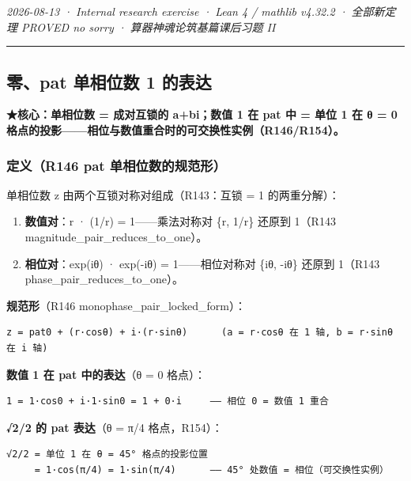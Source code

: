 \documentclass[
]{article}
\providecommand{\tightlist}{%
  \setlength{\itemsep}{0pt}\setlength{\parskip}{0pt}}
\begin{document}
\emph{2026-08-13 · Internal research exercise · Lean 4 / mathlib v4.32.2
· 全部新定理 PROVED no sorry · 算器神魂论筑基篇课后习题 II }

\begin{center}\rule{0.5\linewidth}{0.5pt}\end{center}

\subsection{零、pat 单相位数 1
的表达}\label{ux96f6pat-ux5355ux76f8ux4f4dux6570-1-ux7684ux8868ux8fbe}

\textbf{★核心：单相位数 = 成对互锁的 a+bi；数值 1 在 pat 中 = 单位 1 在
θ = 0 格点的投影------相位与数值重合时的可交换性实例（R146/R154）。}

\subsubsection{定义（R146 pat
单相位数的规范形）}\label{ux5b9aux4e49r146-pat-ux5355ux76f8ux4f4dux6570ux7684ux89c4ux8303ux5f62}

单相位数 z 由两个互锁对称对组成（R143：互锁 = 1 的两重分解）：

\begin{enumerate}
\def\labelenumi{\arabic{enumi}.}
\tightlist
\item
  \textbf{数值对}：r · (1/r) = 1------乘法对称对 \{r, 1/r\} 还原到
  1（R143 magnitude\_pair\_reduces\_to\_one）。
\item
  \textbf{相位对}：exp(iθ) · exp(-iθ) = 1------相位对称对 \{iθ, -iθ\}
  还原到 1（R143 phase\_pair\_reduces\_to\_one）。
\end{enumerate}

\textbf{规范形}（R146 monophase\_pair\_locked\_form）：

\begin{verbatim}
z = pat0 + (r·cosθ) + i·(r·sinθ)      (a = r·cosθ 在 1 轴, b = r·sinθ 在 i 轴)
\end{verbatim}

\textbf{数值 1 在 pat 中的表达}（θ = 0 格点）：

\begin{verbatim}
1 = 1·cos0 + i·1·sin0 = 1 + 0·i     —— 相位 0 = 数值 1 重合
\end{verbatim}

\textbf{√2/2 的 pat 表达}（θ = π/4 格点，R154）：

\begin{verbatim}
√2/2 = 单位 1 在 θ = 45° 格点的投影位置
     = 1·cos(π/4) = 1·sin(π/4)      —— 45° 处数值 = 相位（可交换性实例）
\end{verbatim}
\end{document}
